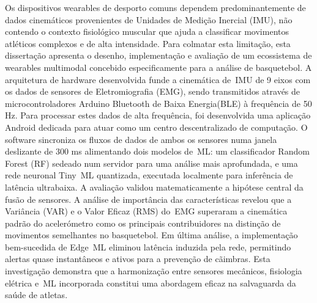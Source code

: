 
%



Os dispositivos wearables de desporto comuns dependem predominantemente de dados cinemáticos provenientes de Unidades 
de Medição Inercial (\gls{IMU}), não contendo o contexto fisiológico muscular que ajuda a classificar movimentos atléticos 
complexos e de alta intensidade. Para colmatar esta limitação, esta dissertação apresenta o desenho, implementação 
e avaliação de um ecossistema de wearables multimodal concebido especificamente para a análise de basquetebol. A 
arquitetura de hardware desenvolvida funde a cinemática de~\gls{IMU} de 9 eixos com os dados de sensores de Eletromiografia 
(\gls{EMG}), sendo transmitidos através de microcontroladores Arduino Bluetooth de Baixa Energia(\gls{BLE}) à frequência de 50 Hz. 
Para processar estes dados de alta frequência, foi desenvolvida uma aplicação Android dedicada para atuar como um 
centro descentralizado de computação. O software sincroniza os fluxos de dados de ambos os sensores numa janela 
deslizante de 300 ms alimentando dois modelos de~\gls{ML}: um classificador Random Forest (\gls{RF}) sedeado num servidor para 
uma análise mais aprofundada, e uma rede neuronal Tiny~\gls{ML} quantizada, executada localmente para inferência de latência 
ultrabaixa. A avaliação validou matematicamente a hipótese central da fusão de sensores. A análise de importância 
das características revelou que a Variância (\gls{VAR}) e o Valor Eficaz (\gls{RMS}) do~\gls{EMG} superaram a cinemática padrão do acelerómetro 
como os principais contribuidores na distinção de movimentos semelhantes no basquetebol. Em última análise, a implementação 
bem-sucedida de Edge~\gls{ML} eliminou latência induzida pela rede, permitindo alertas quase instantâneos e ativos para a 
prevenção de cãimbras. Esta investigação demonstra que a harmonização entre sensores mecânicos, fisiologia elétrica 
e~\gls{ML} incorporada constitui uma abordagem eficaz na salvaguarda da saúde de atletas.





